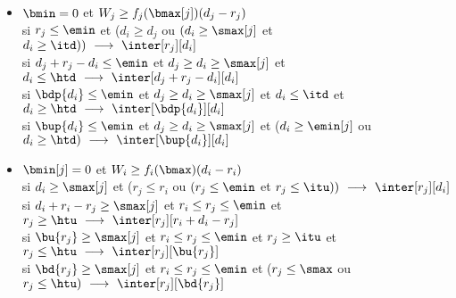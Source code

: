 \documentclass{report}
\begin{document}
\begin{itemize}
  \vspace{0.5cm}

\item $\bmin=0$ et $W_j \ge f_j(\bmax[j])(d_j-r_j)$\\
  \vspace{0.2cm}
  si $r_j \le \emin$ et ($d_i \ge d_j$ ou $(d_i \ge \smax[j]$ et $d_i \ge \itd))\ \longrightarrow\ \inter[r_j][d_i]$\\
  \vspace{0.1cm}
  si $d_j+r_j-d_i \le \emin$ et $d_j \ge d_i \ge \smax[j]$ et $d_i \le \htd\ 
  \longrightarrow\ \inter[d_j+r_j-d_i][d_i]$\\
  \vspace{0.1cm}
  si $\bdp{d_i} \le \emin$ et $d_j \ge d_i \ge \smax[j]$ et $d_i \le \itd$ et 
  $d_i \ge \htd\ \longrightarrow\ \inter[\bdp{d_i}][d_i]$\\
  \vspace{0.1cm}
  si $\bup{d_i} \le \emin$ et $d_j \ge d_i \ge \smax[j]$ et ($d_i \ge \emin[j]$ ou 
  $d_i \ge \htd)\ \longrightarrow\ \inter[\bup{d_i}][d_i]$\\
  \vspace{0.5cm}


\item $\bmin[j]=0$ et $W_i \ge f_i(\bmax)(d_i-r_i)$\\
  \vspace{0.2cm}
  si $d_i \ge \smax[j]$ et ($r_j \le r_i$ ou $(r_j \le \emin$ et $r_j \le \itu))\ \longrightarrow\ \inter[r_j][d_i]$\\
  \vspace{0.1cm}
  si $d_i+r_i-r_j \ge \smax[j]$ et $r_i \le r_j \le \emin$ et $r_j \ge \htu\ 
  \longrightarrow\ \inter[r_j][r_i+d_i-r_j]$\\
  \vspace{0.1cm}
  si $\bu{r_j} \ge \smax[j]$ et $r_i \le r_j \le \emin$ et $r_j \ge \itu$ et 
  $r_j \le \htu\ \longrightarrow\ \inter[r_j][\bu{r_j}]$\\
  \vspace{0.1cm}
  si $\bd{r_j} \ge \smax[j]$ et $r_i \le r_j \le \emin$ et ($r_j \le \smax$ ou 
  $r_j \le \htu)\ \longrightarrow\ \inter[r_j][\bd{r_j}]$\\
  \vspace{0.5cm}


\end{itemize}
\end{document}
